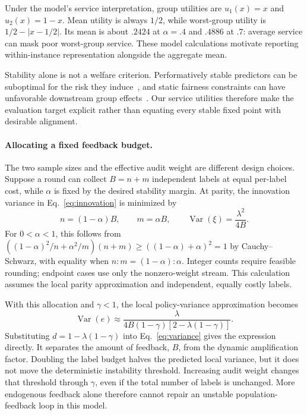 \documentclass{article}
\begin{document}
Under the model's service interpretation, group utilities are $u_1(x)=x$ and $u_2(x)=1-x$. Mean utility is always $1/2$, while worst-group utility is $1/2-|x-1/2|$. Its mean is about $.2424$ at $\alpha=.4$ and $.4886$ at $.7$: average service can mask poor worst-group service. These model calculations motivate reporting within-instance representation alongside the aggregate mean.

Stability alone is not a welfare criterion. Performatively stable predictors can be suboptimal for the risk they induce~\citep{miller2021}, and static fairness constraints can have unfavorable downstream group effects~\citep{liu2018}. Our service utilities therefore make the evaluation target explicit rather than equating every stable fixed point with desirable alignment.

\paragraph{Allocating a fixed feedback budget.}
The two sample sizes and the effective audit weight are different design choices. Suppose a round can collect $B=n+m$ independent labels at equal per-label cost, while $\alpha$ is fixed by the desired stability margin. At parity, the innovation variance in Eq.~\eqref{eq:innovation} is minimized by
\begin{equation}
n=(1-\alpha)B,\qquad m=\alpha B,\qquad
\operatorname{Var}(\xi)=\frac{\lambda^2}{4B}.
\label{eq:allocation}
\end{equation}
For $0<\alpha<1$, this follows from
$((1-\alpha)^2/n+\alpha^2/m)(n+m)\geq((1-\alpha)+\alpha)^2=1$
by Cauchy--Schwarz, with equality when $n:m=(1-\alpha):\alpha$. Integer counts require feasible rounding; endpoint cases use only the nonzero-weight stream. This calculation assumes the local parity approximation and independent, equally costly labels.

With this allocation and $\gamma<1$, the local policy-variance approximation becomes
\begin{equation}
\operatorname{Var}(e)\approx\frac{\lambda}{4B(1-\gamma)[2-\lambda(1-\gamma)]}.
\label{eq:budgetvariance}
\end{equation}
Substituting $d=1-\lambda(1-\gamma)$ into Eq.~\eqref{eq:variance} gives the expression directly. It separates the amount of feedback, $B$, from the dynamic amplification factor. Doubling the label budget halves the predicted local variance, but it does not move the deterministic instability threshold. Increasing audit weight changes that threshold through $\gamma$, even if the total number of labels is unchanged. More endogenous feedback alone therefore cannot repair an unstable population-feedback loop in this model.
\end{document}
